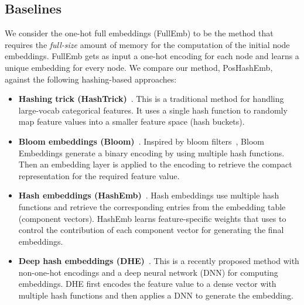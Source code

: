 \documentclass[conference]{IEEEtran}
\begin{document}
\subsection{Baselines}
\label{baselines}
We consider the one-hot full embeddings (FullEmb) to be the method that requires the \textit{full-size} amount of memory for the computation of the initial node embeddings. FullEmb gets as input a one-hot encoding for each node and learns a unique embedding for every node.
% 
We compare our method, PosHashEmb, against the following hashing-based approaches:
\begin{itemize}
    \item \textbf{Hashing trick (HashTrick)}~\cite{weinberger2009feature}. This is a traditional method for handling large-vocab categorical features. It uses a single hash function to randomly map feature values into a smaller feature space (hash buckets). 
    \item \textbf{Bloom embeddings (Bloom)}~\cite{serra2017getting}. Inspired by bloom filters~\cite{bloom1970space}, Bloom Embeddings generate a binary encoding by using multiple hash functions. Then an embedding layer is applied to the encoding to retrieve the compact representation for the required feature value.
    \item \textbf{Hash embeddings (HashEmb)}~\cite{svenstrup2017hash}. Hash embeddings use multiple hash functions and retrieve the corresponding entries from the embedding table (component vectors). HashEmb learns feature-specific weights that uses to control the contribution of each component vector for generating the final embeddings. 
    \item \textbf{Deep hash embeddings (DHE)}~\cite{kang2020deep}. This is a recently proposed method with non-one-hot encodings and a deep neural network (DNN) for computing embeddings. DHE first encodes the feature value to a dense vector with multiple hash functions and then applies a DNN to generate the embedding.

\end{itemize}
\end{document}
